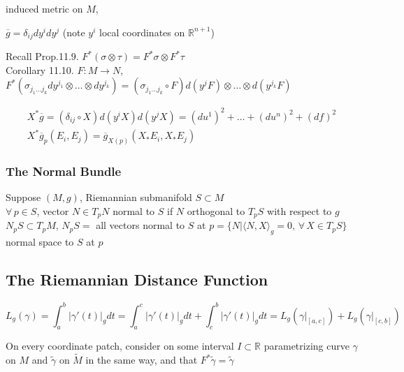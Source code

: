 induced metric on $M$,

$\overline{g} = \delta_{ij} dy^i dy^j$ (note $y^i$ local coordinates on $\mathbb{R}^{n+1}$)

Recall Prop.11.9. $F^*(\sigma \otimes \tau) = F^*\sigma \otimes F^*\tau$ \\
Corollary 11.10.  $F:M \to N$, \\
$F^*(\sigma_{j_1 \dots j_k} dy^{j_1} \otimes \dots \otimes dy^{j_k} ) = (\sigma_{j_1 \dots j_k} \circ F) d(y^j F) \otimes \dots \otimes d(y^{j_k}F)$ 

\[
\begin{gathered}
  X^* \overline{g} = (\delta_{ij} \circ X) d(y^i X) d(y^jX) = (du^1)^2 + \dots + (du^n)^2 + (df)^2 \\
  X^*\overline{g}_p(E_i , E_j) = \overline{g}_{X(p)}(X_* E_i, X_* E_j) 
\end{gathered}
\]


\subsubsection*{The Normal Bundle}

Suppose $(M,g)$, Riemannian submanifold $S\subset M$ \\
\quad $\forall \, p \in S$, vector $N \in T_pN$ normal to $S$ if $N$ orthogonal to $T_pS$ with respect to $g$ \\
\quad \quad $N_p S\subset T_pM$, $N_pS = $ all vectors normal to $S$ at $p = \lbrace N | \langle N, X \rangle_g = 0, \, \forall \, X \in T_pS \rbrace$ normal space to $S$ at $p$ \\



\subsection*{The Riemannian Distance Function}

\[
L_g(\gamma) = \int_a^b |\gamma'(t)|_g dt = \int_a^c |\gamma'(t)|_g dt  + \int_c^b |\gamma'(t) |_g dt = L_g(\left. \gamma \right|_{ [a,c] } ) + L_g( \left. \gamma \right|_{[c,b]} )
\]



On every coordinate patch, consider on some interval $I \subset \mathbb{R}$ parametrizing curve $\gamma$ on $M$ and $\widetilde{\gamma}$ on $\widetilde{M}$ in the same way, and that $F^* \widetilde{\gamma} = \widetilde{\gamma}$


